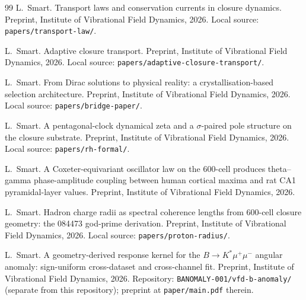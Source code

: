 \documentclass[12pt]{article}
\begin{document}
\begin{thebibliography}{99}
L.~Smart.
\newblock Transport laws and conservation currents in closure dynamics.
\newblock Preprint, Institute of Vibrational Field Dynamics, 2026.
\newblock Local source: \texttt{papers/transport-law/}.

L.~Smart.
\newblock Adaptive closure transport.
\newblock Preprint, Institute of Vibrational Field Dynamics, 2026.
\newblock Local source: \texttt{papers/adaptive-closure-transport/}.

L.~Smart.
\newblock From Dirac solutions to physical reality: a crystallisation-based selection architecture.
\newblock Preprint, Institute of Vibrational Field Dynamics, 2026.
\newblock Local source: \texttt{papers/bridge-paper/}.

L.~Smart.
\newblock A pentagonal-clock dynamical zeta and a $\sigma$-paired pole structure on the closure substrate.
\newblock Preprint, Institute of Vibrational Field Dynamics, 2026.
\newblock Local source: \texttt{papers/rh-formal/}.

L.~Smart.
\newblock A Coxeter-equivariant oscillator law on the 600-cell produces theta--gamma phase-amplitude coupling between human cortical maxima and rat {CA1} pyramidal-layer values.
\newblock Preprint, Institute of Vibrational Field Dynamics, 2026.

L.~Smart.
\newblock Hadron charge radii as spectral coherence lengths from 600-cell closure geometry: the 084473 god-prime derivation.
\newblock Preprint, Institute of Vibrational Field Dynamics, 2026.
\newblock Local source: \texttt{papers/proton-radius/}.

L.~Smart.
\newblock A geometry-derived response kernel for the $B \to K^{*}\mu^{+}\mu^{-}$ angular anomaly: sign-uniform cross-dataset and cross-channel fit.
\newblock Preprint, Institute of Vibrational Field Dynamics, 2026.
\newblock Repository: \texttt{BANOMALY-001/vfd-b-anomaly/} (separate from this repository); preprint at \texttt{paper/main.pdf} therein.

\end{thebibliography}
\end{document}
